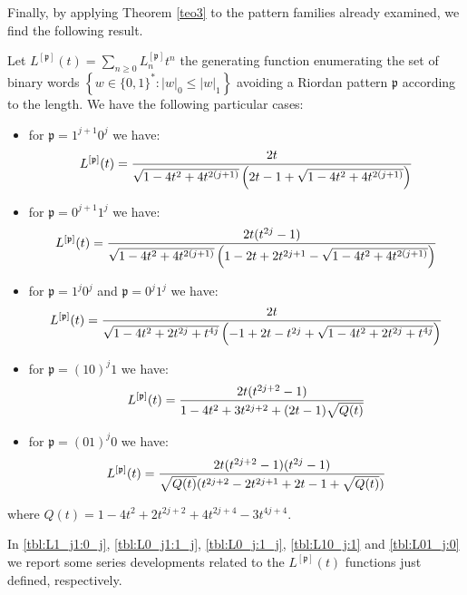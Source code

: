 Finally, by applying Theorem \ref{teo3} to the pattern families already examined, we find the following result.
\begin{corollary}
\label{coroL}
Let  $L^{[\mathfrak{p}]}(t)=\sum_{n\geq 0}L_n^{[\mathfrak{p}]}t^n$ the
generating function enumerating the set of binary words $\left\lbrace w\in
\lbrace 0,1 \rbrace^{*}: |w|_0\leq |w|_1\right\rbrace$ avoiding  a Riordan
pattern $\mathfrak{p}$ according to the length. We have the following
particular cases:
\begin{itemize}

\item for $\mathfrak{p}=1^{j+1}0^j$ we have:
$$ L^{[\mathfrak{p}]}(t)={2t \over \sqrt{1-4t^2+4t^{2(j+1)}}\left(2t-1+ \sqrt{1-4t^2+4t^{2(j+1)}}\right) }$$

\item for $\mathfrak{p}=0^{j+1}1^j$ we have:
$$ L^{[\mathfrak{p}]}(t)={2t(t^{2j}-1) \over \sqrt{1-4t^2+4t^{2(j+1)}} \left(1-2t+2t^{2j+1} -\sqrt{1-4t^2+4t^{2(j+1)}}\right)}$$

\item for $\mathfrak{p}=1^{j}0^j$ and $\mathfrak{p}=0^{j}1^j$ we have:
$$ L^{[\mathfrak{p}]}(t)={2 t \over \sqrt{1-4t^2+2t^{2j}+t^{4j}} \left(-1+2t-t^{2j}+\sqrt{1-4t^{2}+2t^{2j}+t^{4j}}  \right)}$$

\item for $\mathfrak{p}=(10)^j1$ we have:
$$ L^{[\mathfrak{p}]}(t)={2 t (t^{2j+2}-1)\over 1-4t^2+3t^{2j+2}+(2t-1)\sqrt{Q(t)} }$$

\item for $\mathfrak{p}=(01)^j0$ we have:
$$ L^{[\mathfrak{p}]}(t)={2 t (t^{2j+2}-1)(t^{2j}-1)\over  \sqrt{Q(t)} (t^{2j+2}-2t^{2j+1}+2t-1+ \sqrt{Q(t)}) }$$

\end{itemize}
where $Q(t)={1-4t^2+2t^{2j+2}+4t^{2j+4}-3t^{4j+4}}$.
\end{corollary}

In \autoref{tbl:L1_j1:0_j}, \autoref{tbl:L0_j1:1_j}, \autoref{tbl:L0_j:1_j},
\autoref{tbl:L10_j:1} and \autoref{tbl:L01_j:0} we report some series
developments related to the $L^{[\mathfrak{p}]}(t)$ functions just defined,
respectively.

